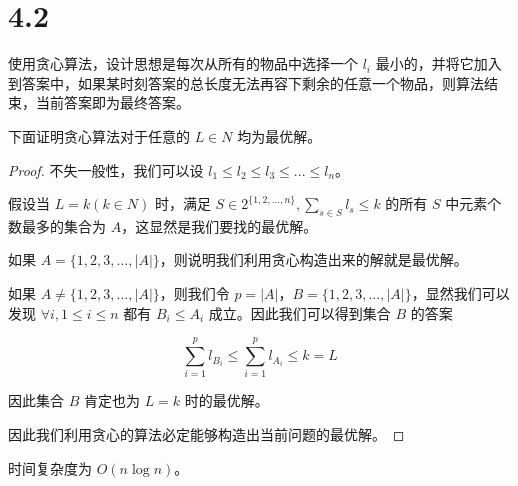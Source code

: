 \section*{4.2}

使用贪心算法，设计思想是每次从所有的物品中选择一个 $l_i$ 最小的，并将它加入到答案中，如果某时刻答案的总长度无法再容下剩余的任意一个物品，则算法结束，当前答案即为最终答案。

下面证明贪心算法对于任意的 $L \in N$ 均为最优解。

\begin{proof}
  不失一般性，我们可以设 $l_1 \le l_2 \le l_3 \le ... \le l_n$。

  假设当 $L = k (k \in N)$ 时，满足 $S \in 2^{\{1,2,...,n\}}, \sum_{s \in S} l_{s} \le k$ 的所有 $S$ 中元素个数最多的集合为 $A$，这显然是我们要找的最优解。

  如果 $A = \{1,2,3,...,|A|\}$，则说明我们利用贪心构造出来的解就是最优解。

  如果 $A \ne \{1,2,3,...,|A|\}$，则我们令 $p = |A|$，$B = \{1,2,3,...,|A|\}$，显然我们可以发现 $\forall i, 1 \le i \le n$ 都有 $B_i \le A_i$ 成立。因此我们可以得到集合 $B$ 的答案

  $$
  \sum_{i=1}^{p}l_{B_i} \le \sum_{i=1}^{p} l_{A_i} \le k = L
  $$

  因此集合 $B$ 肯定也为 $L=k$ 时的最优解。

  因此我们利用贪心的算法必定能够构造出当前问题的最优解。
\end{proof}

时间复杂度为 $O(n \log n)$。

